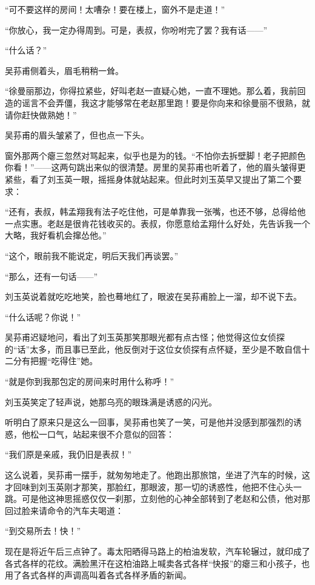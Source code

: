\par “可不要这样的房间！太嘈杂！要在楼上，窗外不是走道！”
\par “你放心，我一定办得周到。可是，表叔，你吩咐完了罢？我有话——”
\par “什么话？”
\par 吴荪甫侧着头，眉毛稍稍一耸。
\par “徐曼丽那边，你得拉紧些，好叫老赵一直疑心她，一直不理她。那么着，我前回造的谣言不会弄僵，我这才能够常在老赵那里跑！要是你向来和徐曼丽不很熟，就请你赶快做熟她！”
\par 吴荪甫的眉头皱紧了，但也点一下头。
\par 窗外那两个瘪三忽然对骂起来，似乎也是为的钱。“不怕你去拆壁脚！老子把颜色你看！”——这两句跳出来似的很清楚。房里的吴荪甫也听着了，他的眉头皱得更紧些，看了刘玉英一眼，摇摇身体就站起来。但此时刘玉英早又提出了第二个要求：
\par “还有，表叔，韩孟翔我有法子吃住他，可是单靠我一张嘴，也还不够，总得给他一点实惠。老赵是很肯花钱收买的。表叔，你愿意给孟翔什么好处，先告诉我一个大略，我好看机会撺怂他。”
\par “这个，眼前我不能说定，明后天我们再谈罢。”
\par “那么，还有一句话——”
\par 刘玉英说着就吃吃地笑，脸也蓦地红了，眼波在吴荪甫脸上一溜，却不说下去。
\par “什么话呢？你说！”
\par 吴荪甫迟疑地问，看出了刘玉英那笑那眼光都有点古怪；他觉得这位女侦探的“话”太多，而且事已至此，他反倒对于这位女侦探有点怀疑，至少是不敢自信十二分有把握“吃得住”她。
\par “就是你到我那包定的房间来时用什么称呼！”
\par 刘玉英笑定了轻声说，她那乌亮的眼珠满是诱惑的闪光。
\par 听明白了原来只是这么一回事，吴荪甫也笑了一笑，可是他并没感到那强烈的诱惑，他松一口气，站起来很不介意似的回答：
\par “我们原是亲戚，我仍旧是表叔！”
\par 这么说着，吴荪甫一摆手，就匆匆地走了。他跑出那旅馆，坐进了汽车的时候，这才回味到刘玉英刚才那笑，那脸红，那眼波，那一切的诱惑性，他把不住心头一跳。可是他这神思摇惑仅仅一刹那，立刻他的心神全部转到了老赵和公债，他对那回过脸来请命令的汽车夫喝道：
\par “到交易所去！快！”
\par 现在是将近午后三点钟了。毒太阳晒得马路上的柏油发软，汽车轮辗过，就印成了各式各样的花纹。满脸黑汗在这柏油路上喊卖各式各样“快报”的瘪三和小孩子，也用了各式各样的声调高叫着各式各样矛盾的新闻。
